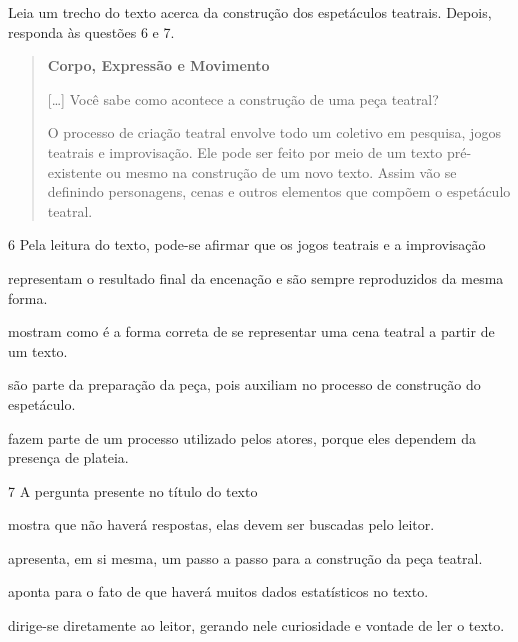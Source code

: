 \pagebreak
Leia um trecho do texto acerca da construção dos espetáculos teatrais.
Depois, responda às questões 6 e 7.

\begin{quote}
\textbf{Corpo, Expressão e Movimento}

{[}\ldots{}{]} Você sabe como acontece a construção de uma peça teatral?


O processo de criação teatral envolve todo um coletivo em pesquisa,
jogos teatrais e improvisação. Ele pode ser feito por meio de um texto
pré-existente ou mesmo na construção de um novo texto. Assim vão se
definindo personagens, cenas e outros elementos que compõem o espetáculo
teatral.

\end{quote}

\num{6} Pela leitura do texto, pode-se afirmar que os jogos teatrais e a
improvisação

\begin{escolha}
\item representam o resultado final da encenação e são sempre reproduzidos
da mesma forma.

\item mostram como é a forma correta de se representar uma cena teatral a
partir de um texto.

\item são parte da preparação da peça, pois auxiliam no processo de
construção do espetáculo.

\item fazem parte de um processo utilizado pelos atores, porque eles
dependem da presença de plateia.
\end{escolha}

\num{7} A pergunta presente no título do texto

\begin{escolha}
\item mostra que não haverá respostas, elas devem ser buscadas pelo
leitor.

\item apresenta, em si mesma, um passo a passo para a construção da peça
teatral.

\item aponta para o fato de que haverá muitos dados estatísticos no texto.

\item dirige-se diretamente ao leitor, gerando nele curiosidade e vontade
de ler o texto.
\end{escolha}

